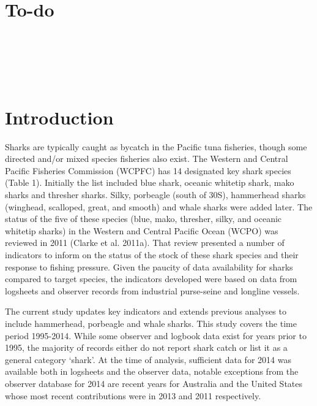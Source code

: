 \documentclass[12pt]{SCreport}
\begin{document}
\wcpfctitlepage

\tableofcontents

\section*{To-do}

\\
\\
\\
\\

\section{Introduction} %


Sharks are typically caught as bycatch in the Pacific tuna fisheries, though some directed and/or mixed species fisheries also exist. The Western and Central Pacific Fisheries Commission (WCPFC) has 14 designated key shark species (Table 1). Initially the list included blue shark, oceanic whitetip shark, mako sharks and thresher sharks. Silky, porbeagle (south of 30\degree{}S), hammerhead sharks (winghead, scalloped, great, and smooth) and whale sharks were added later.  The status of the five of these species (blue, mako, thresher, silky, and oceanic whitetip sharks) in the Western and Central Pacific Ocean (WCPO) was reviewed in 2011 (Clarke et al. 2011a). That review presented a number of indicators to inform on the status of the stock of these shark species and their response to fishing pressure. Given the paucity of data availability for sharks compared to target species, the indicators developed were based on data from logsheets and observer records from industrial purse-seine and longline vessels.

The current study updates key indicators and extends previous analyses to include hammerhead, porbeagle and whale sharks. This study covers the time period 1995-2014. While some observer and logbook data exist for years prior to 1995, the majority of records either do not report shark catch or list it as a general category `shark'.  At the time of analysis, sufficient data for 2014 was available both in logsheets and the observer data, notable exceptions from the observer database for 2014 are recent years for Australia and the United States whose most recent contributions were in 2013 and 2011 respectively.
\end{document}
